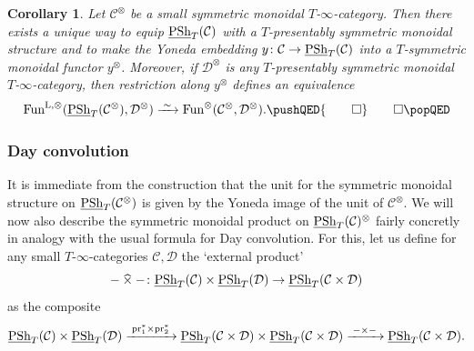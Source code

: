 \documentclass[reqno]{memo-l}
\theoremstyle{mythm}
\newtheorem{cor}[thm]{Corollary}
\theoremstyle{definition}
\numberwithin{equation}{section}
\newcommand{\qednow}{\pushQED{\qed}\qedhere\popQED}
\newcommand{\Cc}{{\mathcal{C}}}
\newcommand{\Dd}{{\mathcal{D}}}
\newcommand{\exttimes}{\mathbin{\widehat{\smash{\times}}}}
\newcommand{\Fun}{{\textup{Fun}}}
\DeclareMathOperator{\PSh}{PSh}
\newcommand{\pr}{\textup{pr}}
\newcommand{\ulhelper}[2]{\underline{\setbox0=\hbox{$#1#2$}\dp0=0.4pt \box0\relax}}
\newcommand{\ul}[1]{{\mathpalette\ulhelper{#1}}\hbox{\rule[-2pt]{0pt}{0pt}}}
\newcommand{\iso}{\xrightarrow{\;\smash{\raisebox{-0.25ex}{\ensuremath{\scriptstyle\sim}}}\;}}
\begin{document}
\begin{cor}
    Let $\Cc^\otimes$ be a small symmetric monoidal $T$-$\infty$-category. Then there exists a unique way to equip $\ul\PSh_T(\Cc)$ with a $T$-presentably symmetric monoidal structure and to make the Yoneda embedding $y\colon\Cc\to\ul\PSh_T(\Cc)$ into a $T$-symmetric monoidal functor $y^\otimes$. Moreover, if $\Dd^\otimes$ is any $T$-presentably symmetric monoidal $T$-$\infty$-category, then restriction along $y^\otimes$ defines an equivalence
    \[
        \Fun^{\textup{L},\otimes}(\ul\PSh_T(\Cc^\otimes),\Dd^\otimes)\iso
        \Fun^\otimes(\Cc^\otimes,\Dd^\otimes).\qednow
    \]
\end{cor}

\subsubsection{Day convolution} It is immediate from the construction that the unit for the symmetric monoidal structure on $\ul\PSh_T(\Cc^\otimes)$ is given by the Yoneda image of the unit of $\Cc^\otimes$. We will now also describe the symmetric monoidal product on $\ul\PSh_T(\Cc)^\otimes$ fairly concretly in analogy with the usual formula for Day convolution. For this, let us define for any small $T$-$\infty$-categories $\Cc,\Dd$ the `external product' \[{-}\exttimes{-}\colon\ul\PSh_T(\Cc)\times\ul\PSh_T(\Dd)\to\ul\PSh_T(\Cc\times\Dd)\] as the composite
\[
    \ul\PSh_T(\Cc)\times\ul\PSh_T(\Dd)\xrightarrow{\;\pr_1^*\times\pr_2^*\;}
    \ul\PSh_T(\Cc\times\Dd)\times\ul\PSh_T(\Cc\times\Dd)\xrightarrow{\;{-}\times{-}\;}\ul\PSh_T(\Cc\times\Dd).
\]
\end{document}
